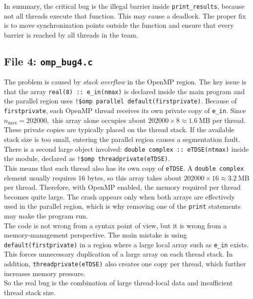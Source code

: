 \documentclass[unicode,10pt,a4paper,oneside,numbers=endperiod,openany]{scrartcl}
\begin{document}
In summary, the critical bug is the illegal barrier inside \texttt{print\_results}, because not all threads execute that function. This may cause a deadlock. The proper fix is to move synchronization points outside the function and ensure that every barrier is reached by all threads in the team.

\subsection{File 4: \texttt{omp\_bug4.c}}

The problem is caused by \emph{stack overflow} in the OpenMP region. The key issue is that the array
\texttt{real(8) :: e\_in(nmax)} is declared inside the main program and the parallel region uses
\texttt{!\$omp parallel default(firstprivate)}.
Because of \texttt{firstprivate}, each OpenMP thread receives its own private copy of \texttt{e\_in}. Since $ n_{\max}=202000, $
this array alone occupies about $202000 \times 8 \approx 1.6\ \text{MB}$
per thread. These private copies are typically placed on the thread stack. If the available stack size is too small, entering the parallel region causes a segmentation fault.\\

There is a second large object involved: \texttt{double complex :: eTDSE(ntmax)} inside the module, declared as \texttt{!\$omp threadprivate(eTDSE)}.\\
This means that each thread also has its own copy of \texttt{eTDSE}. A \texttt{double complex} element usually requires 16 bytes, so this array takes about $202000 \times 16 \approx 3.2\ \text{MB}$
per thread. Therefore, with OpenMP enabled, the memory required per thread becomes quite large. The crash appears only when both arrays are effectively used in the parallel region, which is why removing one of the \texttt{print} statements may make the program run.\\

The code is not wrong from a syntax point of view, but it is wrong from a memory-management perspective. The main mistake is using \texttt{default(firstprivate)} in a region where a large local array such as \texttt{e\_in} exists. This forces unnecessary duplication of a large array on each thread stack. In addition, \texttt{threadprivate(eTDSE)} also creates one copy per thread, which further increases memory pressure.\\
So the real bug is the combination of large thread-local data and insufficient thread stack size.\\
\end{document}
